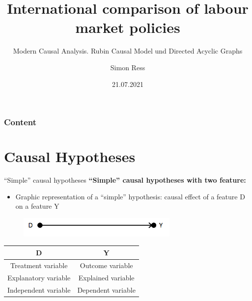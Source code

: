 \documentclass{beamer}\usepackage[]{graphicx}\usepackage[]{color}
\author{Simon Ress}
\institute{Ruhr-Universität Bochum}
\title{International comparison of labour market policies}
\subtitle{Modern Causal Analysis. Rubin Causal Model und Directed Acyclic Graphs}
\date{21.07.2021}
\begin{document}

\maketitle

\begin{frame}
\frametitle{Content} 
\tableofcontents
\end{frame}


\section{Causal Hypotheses} %


\begin{frame}{“Simple” causal hypotheses}
\textbf{“Simple” causal hypotheses with two feature:}
  \begin{itemize}
    \item Graphic representation of a “simple” hypothesis: causal effect of a feature D on a feature Y
  \end{itemize}
  \begin{figure}
	\centering
	\includegraphics[width=0.7\textwidth]{Graphics/D_on_Y.png}
  \end{figure}
  
  \begin{table}[]
    \begin{tabular}{cc}
    \hline \hline
    \textbf{D}           & \textbf{Y}         \\ \hline
    Treatment variable   & Outcome variable   \\
    Explanatory variable  & Explained variable  \\
    Independent variable & Dependent variable \\ \hline \hline
    \end{tabular}
  \end{table}
  
\end{frame}
\end{document}
